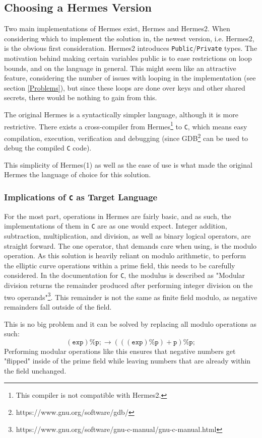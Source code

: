 \subsection{Choosing a Hermes Version}
Two main implementations of Hermes exist, Hermes and Hermes2. When considering which to implement the solution in, the newest version, i.e. Hermes2, is the obvious first consideration. Hermes2 introduces \texttt{Public}/\texttt{Private} types. The motivation behind making certain variables public is to ease restrictions on loop bounds\cite{Hermes2}, and on the language in general. This might seem like an attractive feature, considering the number of issues with looping in the implementation (see section \ref{Problems}), but since these loops are done over keys and other shared secrets, there would be nothing to gain from this.

The original Hermes is a syntactically simpler language, although it is more restrictive. There exists a cross-compiler from Hermes\footnote{This compiler is not compatible with Hermes2.} to \texttt{C}, which means easy compilation, execution, verification and debugging (since GDB\footnote{https://www.gnu.org/software/gdb/} can be used to debug the compiled \texttt{C} code).

This simplicity of Hermes(1) as well as the ease of use is what made the original Hermes the language of choice for this solution. 

\subsubsection{Implications of \texttt{C} as Target Language}
For the most part, operations in Hermes are fairly basic, and as such, the implementations of them in \texttt{C} are as one would expect. Integer addition, subtraction, multiplication, and division, as well as binary logical operators, are straight forward. The one operator, that demands care when using, is the modulo operation. As this solution is heavily reliant on modulo arithmetic, to perform the elliptic curve operations within a prime field, this needs to be carefully considered. In the documentation for \texttt{C}, the modulus is described as "Modular division returns the remainder produced after performing integer division on the two operands"\footnote{https://www.gnu.org/software/gnu-c-manual/gnu-c-manual.html}. This remainder is not the same as finite field modulo, as negative remainders fall outside of the field.

This is no big problem and it can be solved by replacing all modulo operations as such:
$$
\mathtt{(exp)\%p;} \longrightarrow \mathtt{(((exp)\%p)+p)\%p;}
$$
Performing modular operations like this ensures that negative numbers get "flipped" inside of the prime field while leaving numbers that are already within the field unchanged. 


